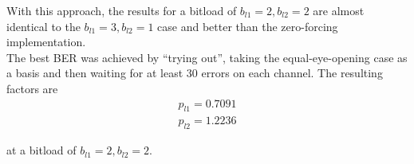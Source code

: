 \documentclass[10pt, a4paper]{article}
\begin{document}
With this approach, the results for a bitload of $b_{l1}=2, b_{l2}=2$ are almost identical to the $b_{l1}=3, b_{l2}=1$ case and better than the zero-forcing implementation.\\

The best BER was achieved by ``trying out'', taking the equal-eye-opening case as a basis and then waiting for at least $30$ errors on each channel. The resulting factors are
\begin{align*}
  p_{l1} = 0.7091\\
  p_{l2} = 1.2236
\end{align*}

at a bitload of $b_{l1} = 2, b_{l2}=2$.
\end{document}
